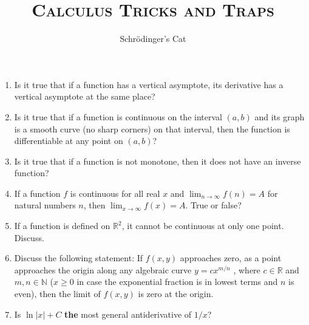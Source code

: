 \documentclass[10pt,a4paper]{article}
\title{\textsc{Calculus Tricks and Traps}}
\date{}
\author{Schrödinger's Cat}
\begin{document}
\maketitle
\newpage

\begin{enumerate}
\item Is it true that if a function has a vertical asymptote, its derivative has a vertical asymptote at the same place?
\item Is it true that if a function is continuous on the interval $(a,b)$ and its graph is a smooth curve (no sharp corners) on that interval, then the function is differentiable at any point on $(a, b)$?
\item Is it true that if  a function is not monotone, then it does not have an inverse function?
\item If a function $f$ is continuous for all real $x$ and $\lim_{n \to \infty} f(n) = A$ for natural numbers $n$, then $\lim_{x \to \infty} f(x) = A$. True or false?
\item If a function is defined on $\mathbb{R}^2$, it cannot be continuous at only one point. Discuss.
\item Discuss the following statement: If $f(x,y)$ approaches zero, as a point approaches the origin along any algebraic curve $y = cx^{m/n}$ , where $c \in \mathbb{R}$ and $m,n \in \mathbb{N}$ ($x \geq 0$ in case the exponential fraction is in lowest terms and $n$ is even), then the limit of $f(x,y)$ is zero at the origin.
\item Is $\ln |x| + C$ \textbf{the} most general antiderivative of $1/x$?
\end{enumerate}
\end{document}
